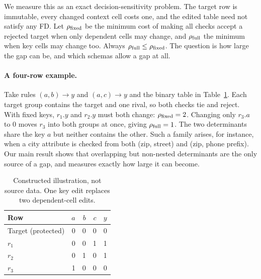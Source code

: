 \documentclass[11pt]{article}
\theoremstyle{remark}
\newcommand{\rfull}{\rho_{\rm full}}
\newcommand{\rfix}{\rho_{\rm fixed}}
\begin{document}
We measure this as an exact decision-sensitivity problem. The target row is
immutable, every changed context cell costs one, and the edited table need not
satisfy any FD. Let $\rfix$ be the minimum cost of making all checks accept a
rejected target when only dependent cells may change, and $\rfull$ the minimum
when key cells may change too. Always $\rfull\le\rfix$. The question is how
large the gap can be, and which schemas allow a gap at all.

\paragraph{A four-row example.}
Take rules $(a,b)\to y$ and $(a,c)\to y$ and the binary table in
Table~\ref{tab:example}. Each target group contains the target and one
rival, so both checks tie and reject. With fixed keys, $r_1.y$ and $r_2.y$
must both change: $\rfix=2$. Changing only $r_3.a$ to $0$ moves $r_3$
into both groups at once, giving $\rfull=1$. The two determinants share the key
$a$ but neither contains the other. Such a family arises, for instance, when a
city attribute is checked from both (zip, street) and (zip, phone prefix). Our main result shows that overlapping but non-nested determinants are the
only source of a gap, and measures exactly how large it can become.

\begin{table}[H]
\centering\small
\begin{tabular}{lrrrr}
\toprule
Row & $a$ & $b$ & $c$ & $y$\\
\midrule
Target (protected) &0&0&0&0\\
$r_1$ &0&0&1&1\\
$r_2$ &0&1&0&1\\
$r_3$ &1&0&0&0\\
\bottomrule
\end{tabular}
\caption{Constructed illustration, not source data. One key edit replaces two
dependent-cell edits.}\label{tab:example}
\end{table}
\end{document}
